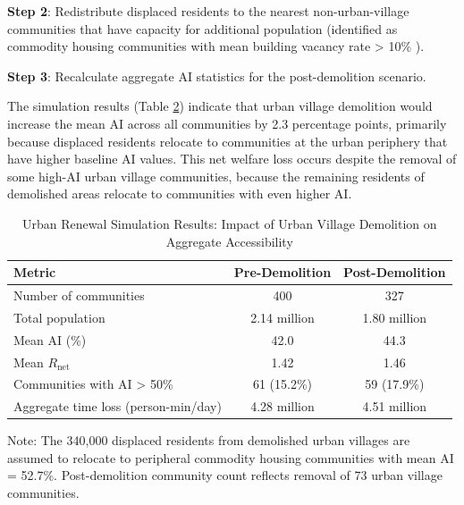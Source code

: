 \documentclass[10pt,conference,compsoc]{IEEEtran}
\begin{document}
\begin{table}[htbp]
\begin{center}
\textbf{Step 2}: Redistribute displaced residents to the nearest non-urban-village communities that have capacity for additional population (identified as commodity housing communities with mean building vacancy rate > 10\% ).

\textbf{Step 3}: Recalculate aggregate AI statistics for the post-demolition scenario.

The simulation results (Table \ref{tab:simulation_results}) indicate that urban village demolition would increase the mean AI across all communities by 2.3 percentage points, primarily because displaced residents relocate to communities at the urban periphery that have higher baseline AI values. This net welfare loss occurs despite the removal of some high-AI urban village communities, because the remaining residents of demolished areas relocate to communities with even higher AI.

\begin{table}[htbp]
\caption{Urban Renewal Simulation Results: Impact of Urban Village Demolition on Aggregate Accessibility}
\label{tab:simulation_results}
\begin{center}
\begin{threeparttable}
\begin{tabular}{lcc}
\toprule
Metric & Pre-Demolition & Post-Demolition \\
\midrule
Number of communities & 400 & 327 \\
Total population & 2.14 million & 1.80 million \\
Mean AI ($\%$) & 42.0 & 44.3 \\
Mean $R_{\text{net}}$ & 1.42 & 1.46 \\
Communities with AI > 50\% & 61 (15.2\%) & 59 (17.9\%) \\
Aggregate time loss (person-min/day) & 4.28 million & 4.51 million \\
\bottomrule
\end{tabular}
\begin{tablenotes}
\item Note: The 340{,}000 displaced residents from demolished urban villages are assumed to relocate to peripheral commodity housing communities with mean AI = 52.7\%. Post-demolition community count reflects removal of 73 urban village communities.
\end{tablenotes}
\end{threeparttable}
\end{center}
\end{table}


\end{center}
\end{table}
\end{document}
